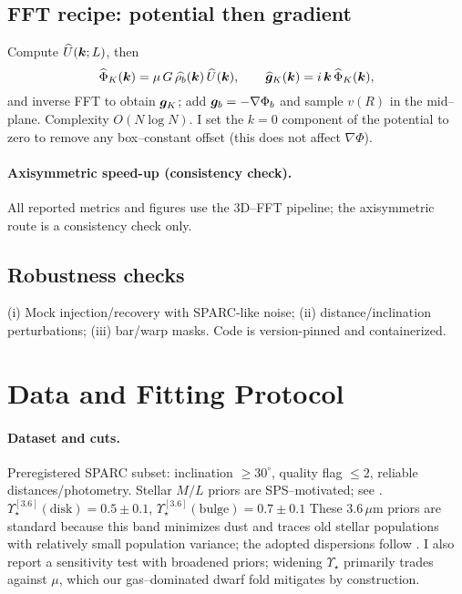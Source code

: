 		\subsection{FFT recipe: potential then gradient}\label{subsec:fft}
		Compute $\widehat{U}(\bm{k};L)$, then
		\[
		\widehat{\Phi}_K(\bm{k})=\mu\,G\,\widehat{\rho_b}(\bm{k})\,\widehat{U}(\bm{k}),
		\qquad
		\widehat{\bm{g}}_K(\bm{k})=i\,\bm{k}\,\widehat{\Phi}_K(\bm{k}),
		\]
		and inverse FFT to obtain $\bm{g}_K$; add $\bm{g}_b=-\nabla\Phi_b$ and sample $v(R)$ in the mid--plane. Complexity $O(N\log N)$. I set the $k=0$ component of the potential to zero to remove any box--constant offset (this does not affect $\nabla\Phi$).
		
		\paragraph{Axisymmetric speed-up (consistency check).}
		All reported metrics and figures use the 3D--FFT pipeline; the axisymmetric route is a consistency check only.
		
		\subsection{Robustness checks}
		(i) Mock injection/recovery with SPARC-like noise; (ii) distance/inclination perturbations; (iii) bar/warp masks. Code is version-pinned and containerized.
		
		\section{Data and Fitting Protocol}\label{sec:methods}
		\paragraph{Dataset and cuts.}
		Preregistered SPARC subset: inclination $\ge 30^\circ$, quality flag $\le 2$, reliable distances/photometry. Stellar $M/L$ priors are SPS--motivated; see \citep{meidt2014mlr36,schombert2014cmlr}.
		$\Upsilon_\star^{[3.6]}(\mathrm{disk})=0.5\pm 0.1$,
		$\Upsilon_\star^{[3.6]}(\mathrm{bulge})=0.7\pm 0.1$
		These $3.6\,\mu$m priors are standard because this band minimizes dust and traces old stellar populations with relatively small population variance; the adopted dispersions follow \citet{meidt2014mlr36,schombert2014cmlr}. I also report a sensitivity test with broadened priors; widening $\Upsilon_\star$ primarily trades against $\mu$, which our gas--dominated dwarf fold mitigates by construction.
		
